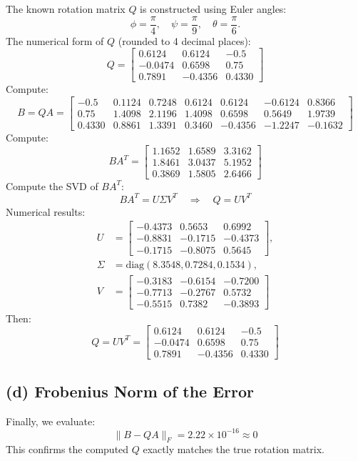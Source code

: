 \documentclass[12pt]{article}
\begin{document}
The known rotation matrix \( Q \) is constructed using Euler angles:
\[
\phi = \frac{\pi}{4}, \quad \psi = \frac{\pi}{9}, \quad \theta = \frac{\pi}{6}.
\]
The numerical form of \( Q \) (rounded to 4 decimal places):
\[
Q = \begin{bmatrix} 0.6124 & 0.6124 & -0.5 \\ -0.0474 & 0.6598 & 0.75 \\ 0.7891 & -0.4356 & 0.4330 \end{bmatrix}
\]
Compute:
\[
B = QA = \begin{bmatrix} -0.5 & 0.1124 & 0.7248 & 0.6124 & 0.6124 & -0.6124 & 0.8366 \\ 0.75 & 1.4098 & 2.1196 & 1.4098 & 0.6598 & 0.5649 & 1.9739 \\ 0.4330 & 0.8861 & 1.3391 & 0.3460 & -0.4356 & -1.2247 & -0.1632 \end{bmatrix}
\]
Compute:
\[
BA^T = \begin{bmatrix} 1.1652 & 1.6589 & 3.3162 \\ 1.8461 & 3.0437 & 5.1952 \\ 0.3869 & 1.5805 & 2.6466 \end{bmatrix}
\]
Compute the SVD of \( BA^T \):
\[
BA^T = U \Sigma V^T \quad \Rightarrow \quad Q = UV^T
\]
Numerical results:
\begin{align*}
U &= \begin{bmatrix} -0.4373 & 0.5653 & 0.6992 \\ -0.8831 & -0.1715 & -0.4373 \\ -0.1715 & -0.8075 & 0.5645 \end{bmatrix}, \\
\Sigma &= \text{diag}(8.3548, 0.7284, 0.1534), \\
V &= \begin{bmatrix} -0.3183 & -0.6154 & -0.7200 \\ -0.7713 & -0.2767 & 0.5732 \\ -0.5515 & 0.7382 & -0.3893 \end{bmatrix}
\end{align*}
Then:
\[
Q = UV^T = \begin{bmatrix} 0.6124 & 0.6124 & -0.5 \\ -0.0474 & 0.6598 & 0.75 \\ 0.7891 & -0.4356 & 0.4330 \end{bmatrix}
\]

\subsection*{(d) Frobenius Norm of the Error}
Finally, we evaluate:
\[
\| B - QA \|_F = 2.22 \times 10^{-16} \approx 0
\]
This confirms the computed \( Q \) exactly matches the true rotation matrix.
\end{document}
